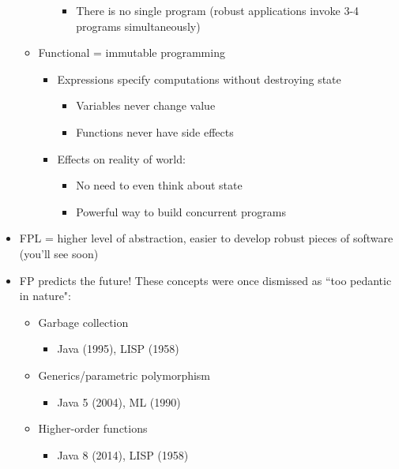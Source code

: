 \begin{itemize}
\begin{itemize}
\begin{itemize}
\begin{itemize}
                \item There is no single program (robust applications invoke 3-4 programs simultaneously)
            \end{itemize}
        \end{itemize}
        \item Functional = immutable programming
        \begin{itemize}
            \item Expressions specify computations without destroying state
            \begin{itemize}
                \item Variables never change value
                \item Functions never have side effects
            \end{itemize}
            \item Effects on reality of world:
            \begin{itemize}
                \item No need to even think about state
                \item Powerful way to build concurrent programs
            \end{itemize}
        \end{itemize}
    \end{itemize}
    \item FPL = higher level of abstraction, easier to develop robust pieces of software (you'll see soon)
    \item FP predicts the future! These concepts were once dismissed as ``too pedantic in nature":
    \begin{itemize}
        \item Garbage collection
        \begin{itemize}
            \item \textsf{Java} (1995), \textsf{LISP} (1958)
        \end{itemize}
        \item Generics/parametric polymorphism
        \begin{itemize}
            \item \textsf{Java 5} (2004), \textsf{ML} (1990)
        \end{itemize}
        \item Higher-order functions
        \begin{itemize}
            \item \textsf{Java 8} (2014), \textsf{LISP} (1958)

\end{itemize}
\end{itemize}
\end{itemize}
